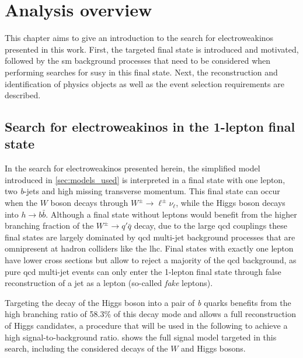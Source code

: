 
\chapter{Analysis overview}\label{ch:1lepton}

\ifpdf
    \graphicspath{{chapter-analysis/Figs/Raster/}{chapter-analysis/Figs/PDF/}{chapter-analysis/Figs/}}
\else
    \graphicspath{{chapter-analysis/Figs/Vector/}{chapter-analysis/Figs/}}
\fi


This chapter aims to give an introduction to the search for electroweakinos presented in this work. First, the targeted final state is introduced and motivated, followed by the \gls{sm} background processes that need to be considered when performing searches for \gls{susy} in this final state. Next, the reconstruction and identification of physics objects as well as the event selection requirements are described.

\section{Search for electroweakinos in the 1-lepton final state}

In the search for electroweakinos presented herein, the simplified model introduced in \cref{sec:models_used} is interpreted in a final state with one lepton, two \textit{b}-jets and high missing transverse momentum. This final state can occur when the $W$ boson decays through $W^\pm\rightarrow\ell^\pm\nu_\ell$, while the Higgs boson decays into $h\rightarrow b\bar{b}$. Although a final state without leptons would benefit from the higher branching fraction of the $W^\pm\rightarrow q'\bar{q}$ decay, due to the large \gls{qcd} couplings these final states are largely dominated by \gls{qcd} multi-jet background processes that are omnipresent at hadron colliders like the \gls{lhc}. Final states with exactly one lepton have lower cross sections but allow to reject a majority of the \gls{qcd} background, as pure \gls{qcd} multi-jet events can only enter the 1-lepton final state through false reconstruction of a jet as a lepton (so-called \textit{fake} leptons). 

Targeting the decay of the Higgs boson into a pair of \textit{b} quarks benefits from the high branching ratio of 58.3\% of this decay mode and allows a full reconstruction of Higgs candidates, a procedure that will be used in the following to achieve a high signal-to-background ratio.   shows the full signal model targeted in this search, including the considered decays of the $W$ and Higgs bosons. 

